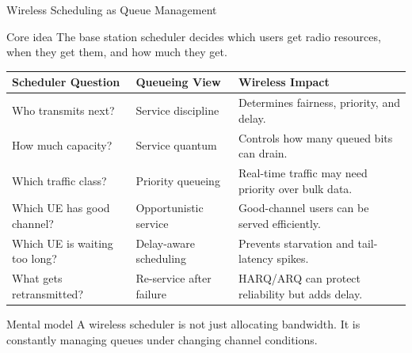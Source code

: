 \documentclass[aspectratio=169]{beamer}
\begin{document}
\begin{frame}{Wireless Scheduling as Queue Management}
\tiny

\begin{block}{Core idea}
The base station scheduler decides which users get radio resources, when they get them, and how much they get.
\end{block}

\vspace{0.15cm}

\begin{tabular}{p{2.6cm} p{4.0cm} p{5.5cm}}
\toprule
\textbf{Scheduler Question} & \textbf{Queueing View} & \textbf{Wireless Impact} \\
\midrule
Who transmits next? & Service discipline & Determines fairness, priority, and delay. \\
How much capacity? & Service quantum & Controls how many queued bits can drain. \\
Which traffic class? & Priority queueing & Real-time traffic may need priority over bulk data. \\
Which UE has good channel? & Opportunistic service & Good-channel users can be served efficiently. \\
Which UE is waiting too long? & Delay-aware scheduling & Prevents starvation and tail-latency spikes. \\
What gets retransmitted? & Re-service after failure & HARQ/ARQ can protect reliability but adds delay. \\
\bottomrule
\end{tabular}

\vspace{0.15cm}

\begin{alertblock}{Mental model}
A wireless scheduler is not just allocating bandwidth. It is constantly managing queues under changing channel conditions.
\end{alertblock}

\end{frame}
\end{document}
